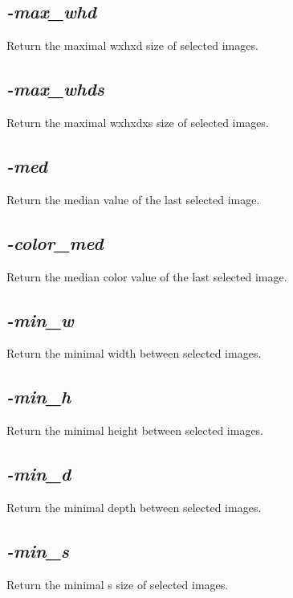 \documentclass[a4paper,11pt,twoside]{book}
\begin{document}
\subsection{\emph{-max\_whd} }\vspace*{-0.5em}
Return the maximal wxhxd size of selected images.


\subsection{\emph{-max\_whds} }\vspace*{-0.5em}
Return the maximal wxhxdxs size of selected images.


\subsection{\emph{-med} }\vspace*{-0.5em}
Return the median value of the last selected image.


\subsection{\emph{-color\_med} }\vspace*{-0.5em}
Return the median color value of the last selected image.


\subsection{\emph{-min\_w} }\vspace*{-0.5em}
Return the minimal width between selected images.


\subsection{\emph{-min\_h} }\vspace*{-0.5em}
Return the minimal height between selected images.


\subsection{\emph{-min\_d} }\vspace*{-0.5em}
Return the minimal depth between selected images.


\subsection{\emph{-min\_s} }\vspace*{-0.5em}
Return the minimal s size of selected images.
\end{document}
